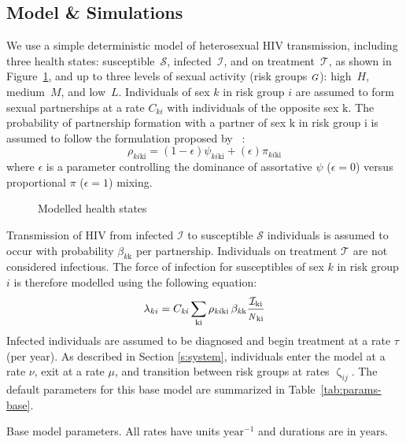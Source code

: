 \documentclass[10pt]{article}
\numberwithin{equation}{section}
\renewcommand{\zeta}{\upzeta}
\newcommand{\N}{{\mbox{\footnotesize{\textit{N}}}}}
\newcommand{\G}{{\mbox{\footnotesize{\textit{G}}}}}
\begin{document}
\subsection{Model \& Simulations}\label{ss:model}
We use a simple deterministic model of heterosexual HIV transmission,
including three health states:
susceptible~$\mathcal{S}$, infected~$\mathcal{I}$, and on treatment~$\mathcal{T}$,
as shown in Figure~\ref{fig:health-states},
and up to three levels of sexual activity (risk groups $\G$):
high~$H$, medium~$M$, and low~$L$.
Individuals of sex $\mathit{k}$ in risk group $i$ are assumed to
form sexual partnerships at a rate $C_{ki}$
with individuals of the opposite sex $\mathrm{k}$.
The probability of partnership formation with
a partner of sex $\mathrm{k}$ in risk group $\mathrm{i}$
is assumed to follow
the formulation proposed by \citeauthor{Garnett1994}~\cite{Garnett1994}:
\begin{equation}
  \rho_{\mathit{ki}\mathrm{ki}} =
  (1-\epsilon)\psi_{\mathit{ki}\mathrm{ki}}
   +(\epsilon)\pi_{\mathit{ki}\mathrm{ki}}
\end{equation}
where $\epsilon$ is a parameter controlling the dominance of
assortative $\psi$ ($\epsilon = 0$) versus proportional $\pi$ ($\epsilon = 1$) mixing.
\begin{figure}
  \centering
  \caption{Modelled health states}\label{fig:health-states}
\end{figure}
\par
Transmission of HIV from infected $\mathcal{I}$ to susceptible $\mathcal{S}$ individuals
is assumed to occur with probability $\beta_{\mathit{k}\mathrm{k}}$ per partnership.
Individuals on treatment $\mathcal{T}$ are not considered infectious.
The force of infection for susceptibles of sex $k$ in risk group $i$
is therefore modelled using the following equation:%
\begin{equation}
  \lambda_{ki} =
  C_{\mathit{ki}}
  \sum_{\mathrm{ki}}
  \rho_{\mathit{ki}\mathrm{ki}} \thinspace
  \beta_{\mathit{k}\mathrm{k}}
  \frac{\mathcal{I}_{\mathrm{ki}}}{\N_{\mathrm{ki}}}
\end{equation}
Infected individuals are assumed to be diagnosed and begin treatment at a rate $\tau$ (per year).
As described in Section \ref{s:system},
individuals enter the model at a rate $\nu$,
exit at a rate $\mu$,
and transition between risk groups at rates $\zeta_{ij}$.
The default parameters for this base model are summarized in
Table~\ref{tab:params-base}.
\begin{table}[b]
  \centering\caption{Base model parameters. All rates have units $\mathrm{year}^{-1}$ and durations are in $\mathrm{years}$.}
  \label{tab:params-base}
  
\end{table}
\end{document}
